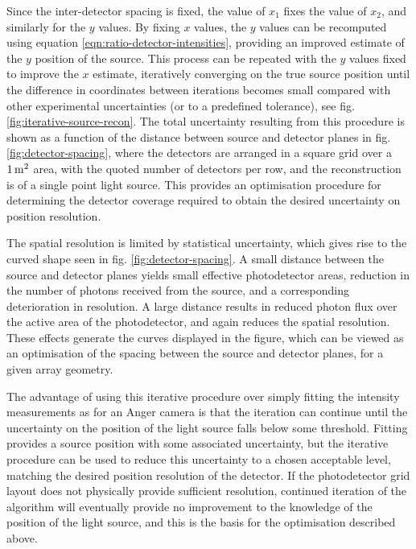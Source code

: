 Since the inter-detector spacing is fixed, the value of $x_1$ fixes the value of $x_2$, and similarly for the $y$ values. By fixing $x$ values, the $y$ values can be recomputed using equation \eqref{eqn:ratio-detector-intensities}, providing an improved estimate of the $y$ position of the source. This process can be repeated with the $y$ values fixed to improve the $x$ estimate, iteratively converging on the true source position until the difference in coordinates between iterations becomes small compared with other experimental uncertainties (or to a predefined tolerance), see fig. \ref{fig:iterative-source-recon}. The total uncertainty resulting from this procedure is shown as a function of the distance between source and detector planes in fig. \ref{fig:detector-spacing}, where the detectors are arranged in a square grid over a $1\metre^2$ area, with the quoted number of detectors per row, and the reconstruction is of a single point light source. This provides an optimisation procedure for determining the detector coverage required to obtain the desired uncertainty on position resolution.

The spatial resolution is limited by statistical uncertainty, which gives rise to the curved shape seen in fig. \ref{fig:detector-spacing}. A small distance between the source and detector planes yields small effective photodetector areas, reduction in the number of photons received from the source, and a corresponding deterioration in resolution. A large distance results in reduced photon flux over the active area of the photodetector, and again reduces the spatial resolution. These effects generate the curves displayed in the figure, which can be viewed as an optimisation of the spacing between the source and detector planes, for a given array geometry.

The advantage of using this iterative procedure over simply fitting the intensity measurements as for an Anger camera is that the iteration can continue until the uncertainty on the position of the light source falls below some threshold. Fitting provides a source position with some associated uncertainty, but the iterative procedure can be used to reduce this uncertainty to a chosen acceptable level, matching the desired position resolution of the detector. If the photodetector grid layout does not physically provide sufficient resolution, continued iteration of the algorithm will eventually provide no improvement to the knowledge of the position of the light source, and this is the basis for the optimisation described above.

